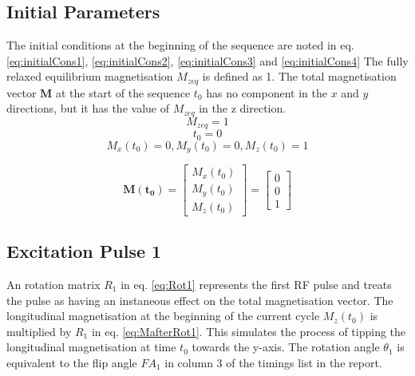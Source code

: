\documentclass[journal]{IEEEtran}
\begin{document}
\subsection{Initial Parameters}
The initial conditions at the beginning of the sequence are noted in eq. \ref{eq:initialCons1}, \ref{eq:initialCons2}, \ref{eq:initialCons3} and \ref{eq:initialCons4}
The fully relaxed equilibrium magnetisation $M_{zeq} $ is defined as 1. The total magnetisation vector $\boldsymbol{M}$ at the start of the sequence $t_{0}$ has no component in the $x$ and $y$ directions, but it has the value of $M_{zeq} $ in the z direction.
\begin{equation} \label{eq:initialCons1}
M_{zeq} = 1
\end{equation}
\begin{equation} \label{eq:initialCons2}
 t_{0} = 0
\end{equation}
\begin{equation} \label{eq:initialCons3}
M_{x}(t_{0}) = 0, M_{y}(t_{0}) = 0, M_{z}(t_{0}) = 1 
\end{equation}

\begin{equation} \label{eq:initialCons4}
\boldsymbol{M(t_{0})} 
=
\begin{bmatrix}
M_{x}(t_{0}) \\
M_{y}(t_{0}) \\
M_{z}(t_{0})
 \end{bmatrix}
=
\begin{bmatrix}
0 \\
0 \\
1
 \end{bmatrix}
\end{equation}

\subsection{Excitation Pulse 1}
An rotation matrix $R_{1}$ in eq. \ref{eq:Rot1} represents the first RF pulse and treats the pulse as having an instaneous effect on the total magnetisation vector. The longitudinal magnetisation at the beginning of the current cycle $M_{z}(t_{0})$ is multiplied by $R_{1}$ in eq. \ref{eq:MafterRot1}. This simulates the process of tipping the longitudinal magnetisation at time $t_{0}$ towards the y-axis. The rotation angle $\theta_{1}$ is equivalent to the flip angle $FA_{1}$ in column 3 of the timings list in the report.
\end{document}
